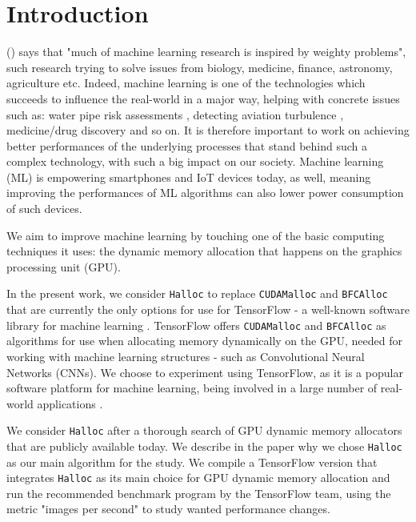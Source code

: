 \documentclass[12pt,twoside]{article}
\begin{document}

\section{Introduction}
\label{sec:introduction}

\citeauthor{mach-learning-matters} (\citeyear{mach-learning-matters}) \cite{mach-learning-matters} says that "much of machine learning research is inspired by weighty problems", such research trying to solve issues from biology, medicine, finance, astronomy, agriculture etc. Indeed, machine learning is one of the technologies which succeeds to influence the real-world in a major way, helping with concrete issues such as: water pipe risk assessments \cite{water-pipe-risk}, detecting aviation turbulence \cite{aviation-turbulence}, medicine/drug discovery \cite{drug-discovery} and so on. It is therefore important to work on achieving better performances of the underlying processes that stand behind such a complex technology, with such a big impact on our society. Machine learning (ML) is empowering smartphones \cite{google-visual-core} and IoT devices \cite{visual-core-iot} today, as well, meaning improving the performances of ML algorithms can also lower power consumption of such devices.

We aim to improve machine learning by touching one of the basic computing techniques it uses: the dynamic memory allocation that happens on the graphics processing unit (GPU). 

In the present work, we consider \texttt{Halloc} \cite{halloc-paper} to replace \texttt{CUDAMalloc} and \texttt{BFCAlloc} that are currently the only options for use for TensorFlow - a well-known software library for machine learning \cite{TensorFlow-main-paper}. TensorFlow offers \texttt{CUDAMalloc} and \texttt{BFCAlloc} as algorithms for use when allocating memory dynamically on the GPU, needed for working with machine learning structures - such as Convolutional Neural Networks (CNNs). We choose to experiment using TensorFlow, as it is a popular software platform for machine learning, being involved in a large number of real-world applications \cite{drug-discovery} \cite{brain-tumor-detection} \cite{security-system}. 

We consider \texttt{Halloc} after a thorough search of GPU dynamic memory allocators that are publicly available today. We describe in the paper why we chose \texttt{Halloc} as our main algorithm for the study. We compile a TensorFlow version that integrates \texttt{Halloc} as its main choice for GPU dynamic memory allocation and run the recommended benchmark program by the TensorFlow team, using the metric "images per second" to study wanted performance changes.
\end{document}
